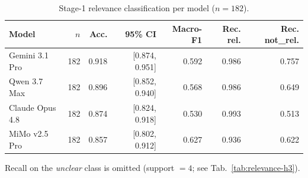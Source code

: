 \begin{table}[htbp]
  \centering
  \caption{Stage-1 relevance classification per model ($n=182$).}
  \label{tab:relevance-models}
  \begin{tabular}{lrrrrrr}
    \toprule
    Model & $n$ & Acc. & 95\% CI & Macro-F1 & Rec. rel. & Rec. not\_rel. \\
    \midrule
    Gemini 3.1 Pro & 182 & 0.918 & [0.874, 0.951] & 0.592 & 0.986 & 0.757 \\
    Qwen 3.7 Max & 182 & 0.896 & [0.852, 0.940] & 0.568 & 0.986 & 0.649 \\
    Claude Opus 4.8 & 182 & 0.874 & [0.824, 0.918] & 0.530 & 0.993 & 0.513 \\
    MiMo v2.5 Pro & 182 & 0.857 & [0.802, 0.912] & 0.627 & 0.936 & 0.622 \\
    \bottomrule
  \end{tabular}
  \par\smallskip\footnotesize Recall on the \emph{unclear} class is omitted (support $=4$; see Tab.~\ref{tab:relevance-h3}).
\end{table}
